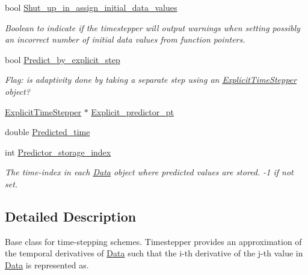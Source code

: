 \begin{DoxyCompactItemize}
bool \hyperlink{classoomph_1_1TimeStepper_a1a8928784f3903a8f0f3f5e2400fa430}{Shut\+\_\+up\+\_\+in\+\_\+assign\+\_\+initial\+\_\+data\+\_\+values}
\begin{DoxyCompactList}\small\item\em Boolean to indicate if the timestepper will output warnings when setting possibly an incorrect number of initial data values from function pointers. \end{DoxyCompactList}\item 
bool \hyperlink{classoomph_1_1TimeStepper_a30f71fb3ee14db4dd9d9d2cef1189ddc}{Predict\+\_\+by\+\_\+explicit\+\_\+step}
\begin{DoxyCompactList}\small\item\em Flag\+: is adaptivity done by taking a separate step using an \hyperlink{classoomph_1_1ExplicitTimeStepper}{Explicit\+Time\+Stepper} object? \end{DoxyCompactList}\item 
\hyperlink{classoomph_1_1ExplicitTimeStepper}{Explicit\+Time\+Stepper} $\ast$ \hyperlink{classoomph_1_1TimeStepper_a41f408e1a313ae5b1806c3a306d720a2}{Explicit\+\_\+predictor\+\_\+pt}
\item 
double \hyperlink{classoomph_1_1TimeStepper_af41318cc5f48050e143182f59a06e5d6}{Predicted\+\_\+time}
\item 
int \hyperlink{classoomph_1_1TimeStepper_af91eb510f32a9d072399f37389853174}{Predictor\+\_\+storage\+\_\+index}
\begin{DoxyCompactList}\small\item\em The time-\/index in each \hyperlink{classoomph_1_1Data}{Data} object where predicted values are stored. -\/1 if not set. \end{DoxyCompactList}\end{DoxyCompactItemize}


\subsection{Detailed Description}
Base class for time-\/stepping schemes. Timestepper provides an approximation of the temporal derivatives of \hyperlink{classoomph_1_1Data}{Data} such that the i-\/th derivative of the j-\/th value in \hyperlink{classoomph_1_1Data}{Data} is represented as. 


